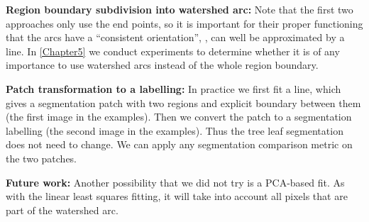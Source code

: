 \textbf{Region boundary subdivision into watershed arc:} Note that the first two approaches only use the end points, so it is important for their proper functioning that the arcs have a ``consistent orientation'', \ie, can well be approximated by a line. In \cref{Chapter5} we conduct experiments to determine whether it is of any importance to use watershed arcs instead of the whole region boundary.

\textbf{Patch transformation to a labelling:} In practice we first fit a line, which gives a segmentation patch with two regions and explicit boundary between them (the first image in the examples). Then we convert the patch to a segmentation labelling (the second image in the examples). Thus the tree leaf segmentation does not need to change. We can apply any segmentation comparison metric on the two patches.

\textbf{Future work:} Another possibility that we did not try is a PCA-based fit. As with the linear least squares fitting, it will take into account all pixels that are part of the watershed arc.

